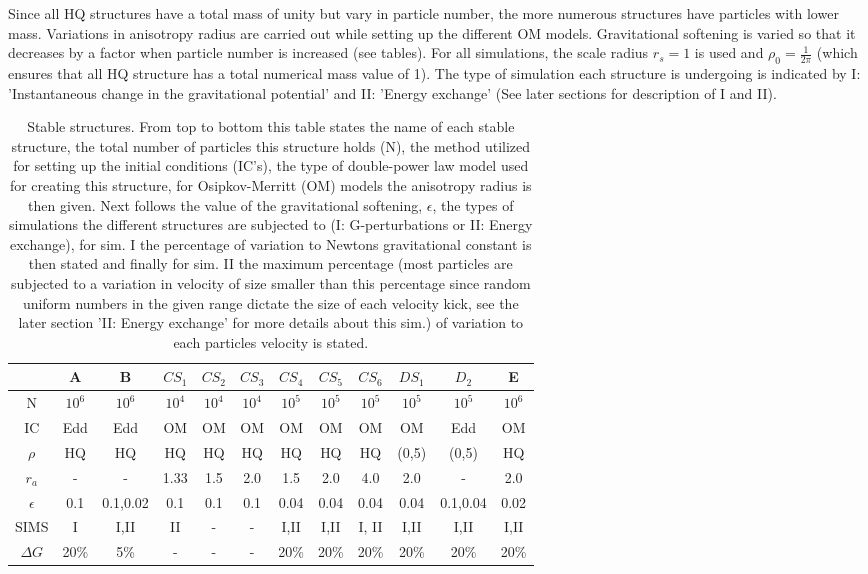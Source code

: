 Since all HQ structures have a total mass of unity but vary in particle number, the more numerous structures have particles with lower mass. Variations in anisotropy radius are carried out while setting up the different OM models. Gravitational softening is varied so that it decreases by a factor when particle number is increased (see tables). For all simulations, the scale radius $r_s = 1$ is used and $\rho_0 = \frac{1}{2 \pi}$ (which ensures that all HQ structure has a total numerical mass value of 1). The type of simulation each structure is undergoing is indicated by I: 'Instantaneous change in the gravitational potential' and II: 'Energy exchange' (See later sections for description of I and II). 
\begin{table}[!htbp]
\centering
\begin{tabular}{|c|c|c|c|c|c|c|c|c|c|c|c|}
\hline
 &A&B&$CS_1$&$CS_2$&$CS_3$&$CS_4$&$CS_5$&$CS_6$&$DS_1$&$D_2$&E \\ \hline
 N &$10^6$&$10^6$&$10^4$&$10^4$&$10^4$&$10^5$&$10^5$&$10^5$&$10^5$&$10^5$&$10^6$ \\ \hline
 IC&Edd&Edd&OM& OM & OM & OM & OM & OM & OM & Edd & OM                \\ \hline
 $\rho$ & HQ & HQ & HQ & HQ & HQ & HQ & HQ & HQ & (0,5) & (0,5) & HQ  \\ \hline
 $r_a$ & - & - & 1.33 & 1.5 & 2.0 & 1.5 & 2.0 & 4.0 & 2.0 & - & 2.0   \\ \hline
 $\epsilon$&0.1&0.1,0.02&0.1&0.1&0.1&0.04&0.04&0.04&0.04&0.1,0.04&0.02\\ \hline
 SIMS & I & I,II & II & - & - & I,II & I,II & I, II & I,II & I,II & I,II \\ \hline
 $\Delta G$ & 20\% & 5\% & - & - & - & 20\% & 20\% & 20\% & 20\% & 20\% & 20\% \\ \hline
\end{tabular}
\caption {Stable structures. From top to bottom this table states the name of each stable structure, the total number of particles this structure holds (N), the method utilized for setting up the initial conditions (IC's), the type of double-power law model used for creating this structure, for Osipkov-Merritt (OM) models the anisotropy radius is then given. Next follows the value of the gravitational softening, $\epsilon$, the types of simulations the different structures are subjected to (I: G-perturbations or II: Energy exchange), for sim. I the percentage of variation to Newtons gravitational constant is then stated and finally for sim. II the maximum percentage (most particles are subjected to a variation in velocity of size smaller than this percentage since random uniform numbers in the given range dictate the size of each velocity kick, see the later section 'II: Energy exchange' for more details about this sim.) of variation to each particles velocity is stated.}
\end{table}
